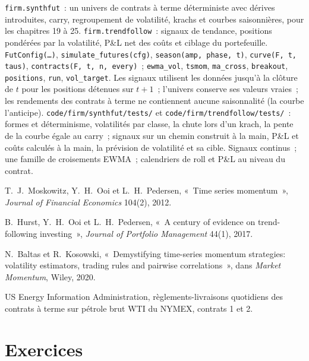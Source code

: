 \begin{build}
 \texttt{firm.synthfut}~: un univers de contrats à terme déterministe avec dérives introduites, carry, regroupement de volatilité, krachs et courbes saisonnières,
pour les chapitres 19 à 25. \texttt{firm.trendfollow}~: signaux de tendance, positions pondérées par la volatilité, P\&L net des coûts et ciblage du portefeuille.
 \texttt{FutConfig(\dots)}, \texttt{simulate\_futures(cfg)}, \texttt{season(amp, phase, t)}, \texttt{curve(F, t, taus)},
\texttt{contracts(F, t, n, every)}~; \texttt{ewma\_vol}, \texttt{tsmom}, \texttt{ma\_cross}, \texttt{breakout}, \texttt{positions}, \texttt{run},
\texttt{vol\_target}.
 Les signaux utilisent les données jusqu'à la clôture de $t$ pour les positions détenues sur $t + 1$~; l'univers conserve ses valeurs vraies~; les rendements des contrats à terme ne contiennent aucune saisonnalité
(la courbe l'anticipe).
 \texttt{code/firm/synthfut/tests/} et \texttt{code/firm/trendfollow/tests/}~: formes et déterminisme, volatilités par classe,
la chute lors d'un krach, la pente de la courbe égale au carry~; signaux sur un chemin construit à la main, P\&L et coûts calculés à la main, la prévision de volatilité et sa cible.
 Signaux continus~; une famille de croisements EWMA~; calendriers de roll et P\&L au niveau du contrat.
\end{build}

\begin{omsources}
\item T.~J.~Moskowitz, Y.~H.~Ooi et L.~H.~Pedersen, «~Time series momentum~», \emph{Journal of Financial Economics} 104(2), 2012.
\item B.~Hurst, Y.~H.~Ooi et L.~H.~Pedersen, «~A century of evidence on trend-following investing~», \emph{Journal of Portfolio Management} 44(1), 2017.
\item N.~Baltas et R.~Kosowski, «~Demystifying time-series momentum strategies: volatility estimators, trading rules and pairwise correlations~», dans
\emph{Market Momentum}, Wiley, 2020.
\item US Energy Information Administration, règlements-livraisons quotidiens des contrats à terme sur pétrole brut WTI du NYMEX, contrats 1 et 2.
\end{omsources}

\section{Exercices}


